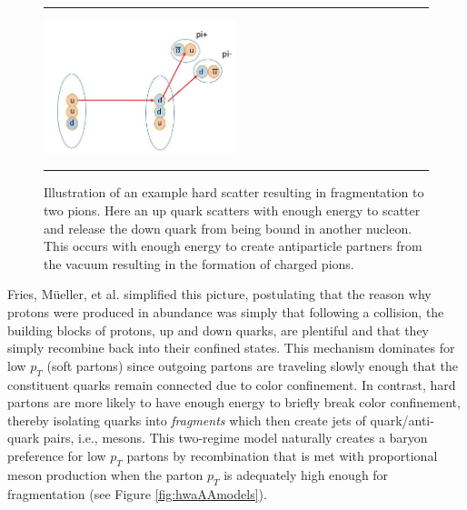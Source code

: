 \begin{figure}[htbp!]
  \centering    \rule{35em}{0.5pt}
    \includegraphics[width=0.5\textwidth]{Figures/fragmentationdiag.JPG}

  \caption[Illustration of an example hard scatter resulting in fragmentation to two pions]{Illustration of an example hard scatter resulting in fragmentation to two pions. Here an up quark scatters with enough energy to scatter and release the down quark from being bound in another nucleon. This occurs with enough energy to create antiparticle partners from the vacuum resulting in the formation of charged pions.}
  \label{fig:fragmentationdiag}    \rule{35em}{0.5pt}
\end{figure} 
Fries, M{\"u}eller, et al. simplified this picture, postulating that the reason why protons were produced in abundance was simply that following a collision, the building blocks of protons, up and down quarks, are plentiful and that they simply recombine back into their confined states. This mechanism dominates for low $p_{T}$ (soft partons) since outgoing partons are traveling slowly enough that the constituent quarks remain connected due to color confinement. In contrast, hard partons are more likely to have enough energy to briefly break color confinement, thereby isolating quarks into \textit{fragments} which then create jets of quark/anti-quark pairs, i.e., mesons. This two-regime model naturally creates a baryon preference for low $p_{T}$ partons by recombination that is met with proportional meson production when the parton $p_{T}$ is adequately high enough for fragmentation (see Figure \ref{fig:hwaAAmodels}).


